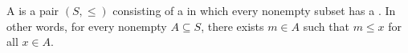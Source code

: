 \begin{definition} \label{definition:well_ordered_set}
A  is a pair $(S, \leq)$ consisting of a  in which every nonempty subset has a . In other words, for every nonempty $A \subseteq S$, there exists $m \in A$ such that $m \leq x$ for all $x \in A$.
\end{definition}
